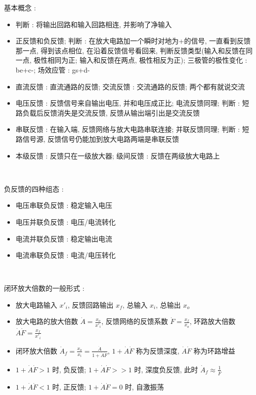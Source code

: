 \documentclass[UTF8, 12pt]{ctexart}
\begin{document}
	\noindent
	基本概念 :
	\begin{itemize}[leftmargin = 4em]
		\item 判断 : 将输出回路和输入回路相连, 并影响了净输入
		\item 正反馈和负反馈; 判断 : 在放大电路加一个瞬时对地为+的信号, 一直看到反馈那一点, 得到该点相位, 在沿着反馈信号看回来, 判断反馈类型(输入和反馈在同一点, 极性相同为正; 输入和反馈在两点, 极性相反为正); 三极管的极性变化 : be+c-; 场效应管 : gs+d-
		\item 直流反馈 : 直流通路的反馈; 交流反馈 : 交流通路的反馈; 两个都有就说交流
		\item 电压反馈 : 反馈信号来自输出电压, 并和电压成正比; 电流反馈同理; 判断 : 短路负载后反馈消失是交流反馈, 反馈从输出端引出是交流反馈
		\item 串联反馈 : 在输入端, 反馈网络与放大电路串联连接; 并联反馈同理; 判断 : 短路信号源, 反馈信号仍能加到放大电路两端是串联反馈
		\item 本级反馈 : 反馈只在一级放大器; 级间反馈 : 反馈在两级放大电路上
	\end{itemize}

	~

	\noindent
	负反馈的四种组态 :
	\begin{itemize}[leftmargin = 4em]
		\item 电压串联负反馈 : 稳定输入电压
		\item 电压并联负反馈 : 电压/电流转化
		\item 电流并联负反馈 : 稳定输出电流
		\item 电流串联负反馈 : 电流/电压转化
	\end{itemize}

	~

	\noindent
	闭环放大倍数的一般形式 :
	\begin{itemize}[leftmargin = 4em]
		\item 放大电路输入 $ x'_{i} $, 反馈回路输出 $ x_{f} $, 总输入 $ x_{i} $, 总输出 $ x_{o} $
		\item 放大电路的放大倍数 $ \dot{A} = \frac{x_{o}}{x'_{i}} $, 反馈网络的反馈系数 $ \dot{F} = \frac{x_{f}}{x_{o}} $, 环路放大倍数 $ \dot{A}\dot{F} = \frac{x_{f}}{x'_{i}} $
		\item 闭环放大倍数 $ \dot{A}_{f} = \frac{x_{o}}{x_{i}} = \frac{\dot{A}}{1+\dot{A}\dot{F}} $, $ 1+\dot{A}\dot{F} $ 称为反馈深度, $ \dot{A}\dot{F} $ 称为环路增益
		\item $ 1+\dot{A}\dot{F} > 1 $ 时, 负反馈; $ 1+\dot{A}\dot{F} >> 1 $ 时, 深度负反馈, 此时 $ \dot{A}_{f} \approx \frac{1}{\dot{F}} $ 
		\item $ 1+\dot{A}\dot{F} < 1 $ 时, 正反馈; $ 1+\dot{A}\dot{F} = 0 $ 时, 自激振荡
	\end{itemize}
\end{document}
